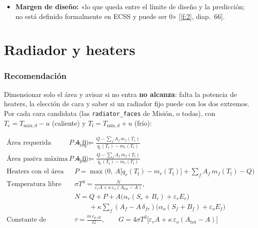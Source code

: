 \documentclass[11pt,a4paper]{article}
\newcommand{\code}[1]{\texttt{#1}}
\newcommand{\op}[1]{\textcolor{opinion}{\textit{(#1)}}}
\newcommand{\f}[1]{\ref{f:#1}}
\begin{document}
\begin{itemize}
\begin{itemize}
    \item Un nodo único es el modelo más grueso posible: 15\,K de [\f{2}] es lo coherente \op{opinión}.
  \end{itemize}
  \item \textbf{Margen de diseño:} «lo que queda entre el límite de diseño y la predicción; no está definido formalmente en ECSS y puede ser 0» [\f{2}, diap.~66].
\end{itemize}

\section{Radiador y heaters}\label{sec:radiador}

\subsubsection*{Recomendación}

Dimensionar solo el área y avisar si no entra \textbf{no alcanza}: falta la potencia de heaters, la elección de cara y saber si un radiador fijo puede con los dos extremos. Por cada cara candidata (las \code{radiator\_faces} de Misión, o todas), con $T_\mathrm{c} = T_{\text{máx},d} - u$ (caliente) y $T_\mathrm{f} = T_{\text{mín},d} + u$ (frío):

\begin{align*}
  \text{Área requerida (candidato caliente, $P = 0$):} \quad
    & A_\mathrm{req} = \frac{Q - \sum_f A_f\, m_f(T_\mathrm{c})}{q_r(T_\mathrm{c}) - m_r(T_\mathrm{c})} \\[6pt]
  \text{Área pasiva máxima (candidato frío, $P = 0$):} \quad
    & A_\mathrm{pas} = \frac{Q - \sum_f A_f\, m_f(T_\mathrm{f})}{q_r(T_\mathrm{f}) - m_r(T_\mathrm{f})} \\[6pt]
  \text{Heaters con el área fijada (candidato frío):} \quad
    & P = \max\!\Big(0,\ A\big[q_r(T_\mathrm{f}) - m_r(T_\mathrm{f})\big] + \sum_f A_f\, m_f(T_\mathrm{f}) - Q\Big) \\[6pt]
  \text{Temperatura libre (cerrada):} \quad
    & \sigma T^4 = \frac{N}{\varepsilon_r A + \kappa\, \varepsilon_o (A_\mathrm{tot} - A)}, \\[2pt]
    & N = Q + P + A\big(\alpha_r (S_r + B_r) + \varepsilon_r E_r\big) \\
    & \phantom{N = {}} + \kappa \sum_f (A_f - A\,\delta_{fr}) \big(\alpha_o (S_f + B_f) + \varepsilon_o E_f\big) \\[6pt]
  \text{Constante de tiempo:} \quad
    & \tau = \frac{m\, c_{p,\mathrm{eff}}}{G}, \qquad G = 4\sigma T^3 \big[\varepsilon_r A + \kappa\, \varepsilon_o (A_\mathrm{tot} - A)\big]
\end{align*}
\end{document}
